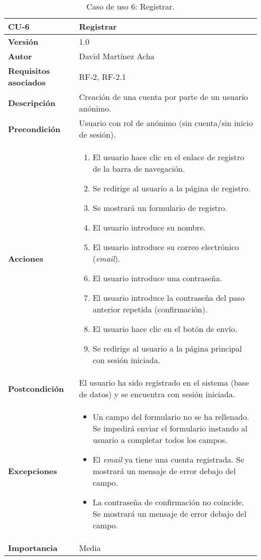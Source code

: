 \begin{table}[p]
	\centering
	\begin{tabularx}{\linewidth}{ p{} p{} }
		\toprule
		\textbf{CU-6}    & \textbf{Registrar}\\
		\toprule
		\textbf{Versión}              & 1.0    \\
		\textbf{Autor}                & David Martínez Acha \\
		\textbf{Requisitos asociados} & RF-2, RF-2.1 \\
		\textbf{Descripción}          & Creación de una cuenta por parte de un usuario anónimo. \\
		\textbf{Precondición}         & Usuario con rol de anónimo (sin cuenta/sin inicio de sesión). \\
		\textbf{Acciones}             &
		\begin{enumerate}
			\def\labelenumi{\arabic{enumi}.}
			\tightlist
			\item El usuario hace clic en el enlace de registro de la barra de navegación.
			\item Se redirige al usuario a la página de registro.
			\item Se mostrará un formulario de registro.
			\item El usuario introduce su nombre.
			\item El usuario introduce su correo electrónico (\textit{email}).
			\item El usuario introduce una contraseña.
			\item El usuario introduce la contraseña del paso anterior repetida (confirmación).
            \item El usuario hace clic en el botón de envío.
			\item Se redirige al usuario a la página principal con sesión iniciada.
		\end{enumerate}\\
		\textbf{Postcondición}        & El usuario ha sido registrado en el sistema (base de datos) y se encuentra con sesión iniciada. \\
		\textbf{Excepciones}          & \begin{itemize}
			\item Un campo del formulario no se ha rellenado. Se impedirá enviar el formulario instando al usuario a completar todos los campos.
			\item El \emph{email} ya tiene una cuenta registrada. Se mostrará un mensaje de error debajo del campo.
			\item La contraseña de confirmación no coincide. Se mostrará un mensaje de error debajo del campo.
		\end{itemize}\\
		\textbf{Importancia}          & Media \\
		\bottomrule
	\end{tabularx}
	\caption{Caso de uso 6: Registrar.}
\end{table}

